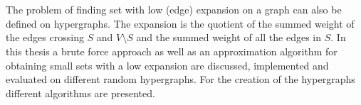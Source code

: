 \chapter{\abstractname}

The problem of finding set with low (edge) expansion on a graph can also be defined on hypergraphs. The expansion is the quotient of the summed weight of the edges crossing $S$ and $V\setminus S$ and the summed weight of all the edges in $S$.
In this thesis a brute force approach as well as an approximation algorithm for obtaining small sets with a low expansion are discussed, implemented and evaluated on different random hypergraphs. For the creation of the hypergraphs different algorithms are presented.



